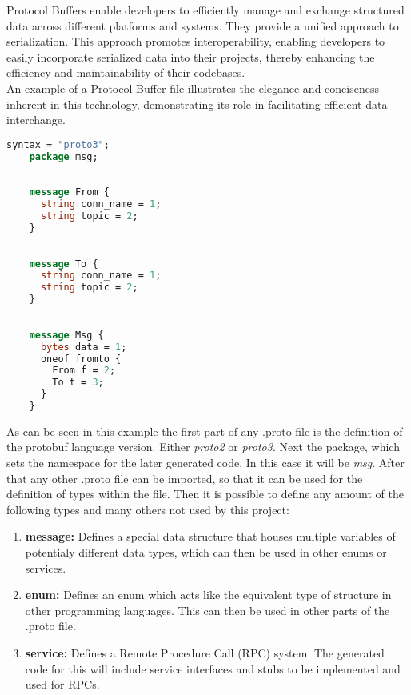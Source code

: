 Protocol Buffers enable developers to efficiently manage and exchange structured data across different platforms and systems. They provide a unified approach 
to serialization. This approach promotes interoperability, enabling developers to easily incorporate serialized data into their projects, thereby enhancing the efficiency and 
maintainability of their codebases.\\

An example of a Protocol Buffer file illustrates the elegance and conciseness inherent in this technology, demonstrating its role in facilitating efficient 
data interchange.

\begin{minipage}{\textwidth}
\begin{lstlisting}[language=ProtoBuf, caption=Excerpt taken from the ProtoBuf files of this project]
    syntax = "proto3";
    package msg;
    
    
    message From {
      string conn_name = 1;
      string topic = 2;
    }
    
    
    message To {
      string conn_name = 1;
      string topic = 2;
    }
    
    
    message Msg {
      bytes data = 1;
      oneof fromto {
        From f = 2;
        To t = 3;
      }
    }
\end{lstlisting}
\end{minipage}

As can be seen in this example the first part of any .proto file is the definition of the protobuf language version. Either \textit{proto2} or \textit{proto3}. Next the package, 
which sets the namespace for the later generated code. In this case it will be \textit{msg}. After that any other .proto file can be imported, so that it can be used for the definition of types within the file.
Then it is possible to define any amount of the following types and many others not used by this project:
\begin{enumerate}
    \item \textbf{message:} Defines a special data structure that houses multiple variables of potentialy different data types, which can then be used in other enums or services.
    \item \textbf{enum:} Defines an enum which acts like the equivalent type of structure in other programming languages. This can then be used in other parts of the .proto file.
    \item \textbf{service:} Defines a Remote Procedure Call (RPC) system. The generated code for this will include service interfaces and stubs to be implemented and used for RPCs.
\end{enumerate}

